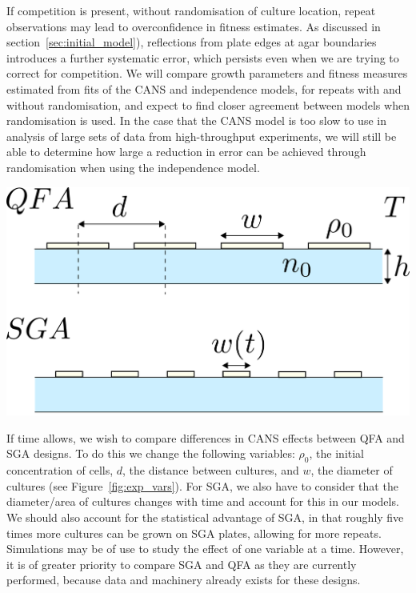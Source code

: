 If competition is present, without randomisation of culture location,
repeat observations may lead to overconfidence in fitness
estimates. As discussed in section~\ref{sec:initial_model}),
reflections from plate edges at agar boundaries introduces a further
systematic error, which persists even when we are trying to correct
for competition. We will compare growth parameters and fitness
measures estimated from fits of the CANS and independence models, for
repeats with and without randomisation, and expect to find closer
agreement between models when randomisation is used. In the case that
the CANS model is too slow to use in analysis of large sets of
data from high-throughput experiments, we will still be able to
determine how large a reduction in error can be achieved through
randomisation when using the independence model.

\begin{Figure}
  \centering
  \includegraphics[width=\linewidth]{qfa_v_sga_vars}
  \label{fig:exp_vars}
\end{Figure}

If time allows, we wish to compare differences in CANS effects between
QFA and SGA designs. To do this we change the following variables:
\(\rho_{0}\), the initial concentration of cells, \(d\), the distance
between cultures, and \(w\), the diameter of cultures (see
Figure~\ref{fig:exp_vars}). For SGA, we also have to consider that the
diameter/area of cultures changes with time and account for this in
our models. We should also account for the statistical advantage of
SGA, in that roughly five times more cultures can be grown on SGA
plates, allowing for more repeats. Simulations may be of use to study
the effect of one variable at a time. However, it is of greater
priority to compare SGA and QFA as they are currently performed,
because data and machinery already exists for these designs.

